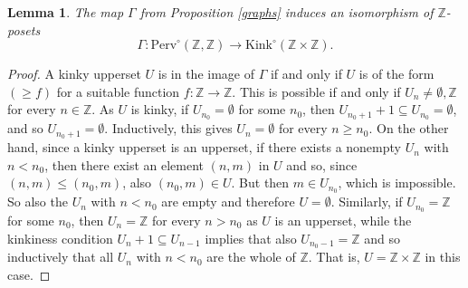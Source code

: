 \documentclass{article}
\newtheorem{lem}[thm]{Lemma}
\theoremstyle{definition}
\newcommand{\Z}{\mathbb{Z}}
\newcommand{\gr}{\Gamma}
\begin{document}
\begin{lem}
The map $\Gamma$ from Proposition \ref{graphs} induces an isomorphism of $\Z$-posets
  \[
 \gr \colon \mathrm{Perv}^\circ(\Z,\Z)\to \mathrm{Kink}^\circ(\Z\times \Z).
  \]
\end{lem}
\begin{proof}
A kinky upperset $U$ is in the image of $\Gamma$ if and only if $U$ is of the form $(\geq f)$ for a suitable function $f\colon \Z\to \Z$. This is possible if and only if $U_n\neq \emptyset,\Z$ for every $n\in \Z$. As $U$ is kinky, if $U_{n_0}=\emptyset$ for some $n_0$, then $U_{n_0+1}+1\subseteq U_{n_0}=\emptyset$, and so $U_{n_0+1}=\emptyset$. Inductively, this gives $U_n=\emptyset$ for every $n\geq n_0$.  On the other hand, since a kinky upperset is an upperset, if there exists a nonempty $U_n$ with $n<n_0$, then there exist an element $(n,m)$ in $U$ and so, since $(n,m)\leq (n_0,m)$, also $ (n_0,m)\in U$. But then $m\in U_{n_0}$, which is impossible. So also the $U_n$ with $n<n_0$ are empty and therefore $U=\emptyset$. Similarly, if $U_{n_0}=\Z$ for some $n_0$, then $U_n=\Z$ for every $n>n_0$ as $U$ is an upperset, while the kinkiness condition $U_{n}+1\subseteq U_{n-1}$ implies that also $U_{n_0-1}=\Z$ and so inductively that all $U_n$ with $n<n_0$ are the whole of $\Z$. That is, $U=\Z\times\Z$ in this case. 
\end{proof}
\end{document}
